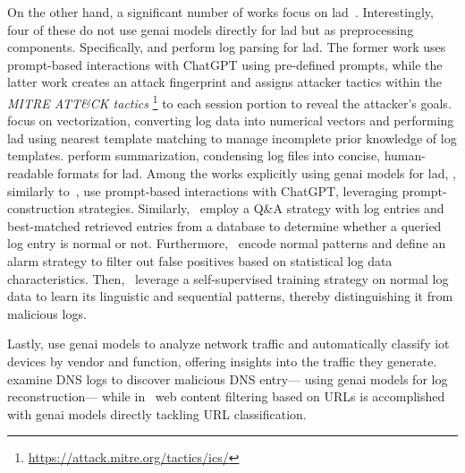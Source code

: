 %
On the other hand, a significant number of works focus on \gls{lad}~\cite{qi2023loggpt, pan2023raglog,ji2023log, karlsen2024large, sun2023design, han2023loggpt, boffa2024logprecis, mudgal2023assessment, ott2021robust, balasubramanian2024cygent, almodovar2024logfit}.
%
Interestingly, four of these do not use \gls{genai} models directly for \gls{lad} but as preprocessing components.
Specifically, \citet{mudgal2023assessment} and \citet{boffa2024logprecis} perform log parsing for \gls{lad}.
The former work uses prompt-based interactions with ChatGPT using pre-defined prompts, while the latter work creates an attack fingerprint and assigns attacker tactics within the \emph{MITRE ATT\&CK tactics}%
\footnote{\url{https://attack.mitre.org/tactics/ics/}} 
to each session portion to reveal the attacker’s goals.
\citet{ott2021robust} focus on vectorization, converting log data into numerical vectors and performing \gls{lad} using nearest template matching to manage incomplete prior knowledge of log templates.
\citet{balasubramanian2024cygent} perform summarization, condensing log files into concise, human-readable formats for \gls{lad}.
Among the works explicitly using \gls{genai} models for \gls{lad},
\citet{qi2023loggpt}, similarly to~\cite{mudgal2023assessment},
use prompt-based interactions with ChatGPT,
leveraging prompt-construction strategies.
Similarly,~\citet{pan2023raglog} employ a Q\&A strategy with log entries and best-matched retrieved entries from a database to determine whether a queried log entry is normal or not.
Furthermore,~\citet{ji2023log} encode normal patterns and define an alarm strategy to filter out false positives based on statistical log data characteristics.
%
Then,~\citet{almodovar2024logfit} leverage a self-supervised training strategy on normal log data to learn its linguistic and sequential patterns, thereby distinguishing it from malicious logs.
%

Lastly,
\citet{meyuhas2024} use \gls{genai} models to analyze network traffic and automatically classify \gls{iot} devices by vendor and function, offering insights into the traffic they generate.
\citet{tian2024dom} examine DNS logs to discover malicious DNS entry---%
using \gls{genai} models for log reconstruction---%
while in~\cite{voros2023web} web content filtering based on URLs is accomplished with \gls{genai} models directly tackling URL classification.
























